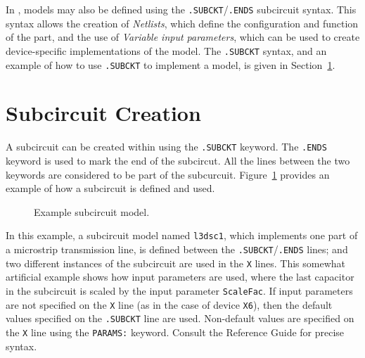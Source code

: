 In \Xyce{}, models may also be defined using the
\texttt{.SUBCKT}/\texttt{.ENDS} subcircuit syntax. This syntax allows the
creation of {\em Netlists}, which define the configuration and function of the
part, and the use of {\em Variable input parameters}, which can be used to
create device-specific implementations of the model.  The \texttt{.SUBCKT}
syntax, and an example of how to use \texttt{.SUBCKT} to implement a model, is
given in Section~\ref{Subcircuit_Sect}.

\clearpage
\section{Subcircuit Creation}
\label{Subcircuit_Sect}

A subcircuit can be created within \Xyce{} using the \texttt{.SUBCKT} keyword.
The \texttt{.ENDS} keyword is used to mark the end of the subcircut. All the
lines between the two keywords are considered to be part of the subcurcuit.  
Figure~\ref{Subcircuit_Example} provides an example of how a subcircuit is
defined and used.

\begin{figure}[H]
\begin{centering}
\caption{Example subcircuit model.\label{Subcircuit_Example}}
\end{centering}
\end{figure}

In this example, a subcircuit model named \texttt{l3dsc1}, which implements one
part of a microstrip transmission line, is defined between the
\texttt{.SUBCKT}/\texttt{.ENDS} lines; and two different instances of the
subcircuit are used in the \texttt{X} lines.  This somewhat artificial example
shows how input parameters are used, where the last capacitor in the subcircuit
is scaled by the input parameter \texttt{ScaleFac}.  If input parameters are
not specified on the \texttt{X} line (as in the case of device \texttt{X6}),
then the default values specified on the \texttt{.SUBCKT} line are used.
Non-default values are specified on the \texttt{X} line using the
\texttt{PARAMS:} keyword.  Consult the \Xyce{} Reference Guide\ReferenceGuide{}
for precise syntax.

